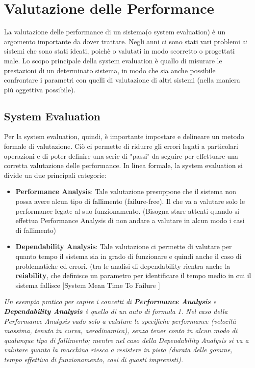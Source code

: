 \chapter{Valutazione delle Performance}
La valutazione delle performance di un sistema(o system evaluation) è un argomento importante da dover trattare. Negli anni ci sono stati vari problemi ai sistemi che sono stati ideati, poichè o valutati in modo scorretto o progettati male. Lo scopo principale della system evaluation è quallo di misurare le prestazioni di un determinato sistema, in modo che sia anche possibile confrontare i parametri con quelli di valutazione di altri sistemi (nella maniera più oggettiva possibile).

\section{System Evaluation}
Per la system evaluation, quindi, è importante impostare e delineare un metodo formale di valutazione. Ciò ci permette di ridurre gli errori legati a particolari operazioni e di poter definire una serie di "passi" da seguire per effettuare una corretta valutazione delle performance.
In linea formale, la system evaluation si divide un due principali categorie:
\begin{itemize}
    \item \textbf{Performance Analysis}: Tale valutazione presuppone che il sistema non possa avere alcun tipo di fallimento (failure-free). Il che va a valutare solo le performance legate al suo funzionamento. (Bisogna stare attenti quando si effettua Performance Analysis di non andare a valutare in alcun modo i casi di fallimento)
    
    \item \textbf{Dependability Analysis}: Tale valutazione ci permette di valutare per quanto tempo il sistema sia in grado di funzionare e quindi anche il caso di problematiche ed errori. (tra le analisi di dependability rientra anche la \textbf{reiability}, che definisce un parametro per identificare il tempo medio in cui il sistema fallisce [System Mean Time To Failure ]
\end{itemize}

\textit{Un esempio pratico per capire i concetti di \textbf{Performance Analysis} e \textbf{Dependability Analysis} è quello di un auto di formula 1. Nel caso della Performance Analysis vado solo a valutare le specifiche performance (velocità massima, tenuta in curva, aerodinamica), senza tener conto in alcun modo di qualunque tipo di fallimento; mentre nel caso della Dependability Analysis si va a valutare quanto la macchina riesca a resistere in pista (durata delle gomme, tempo effettivo di funzionamento, casi di guasti imprevisti).
}

